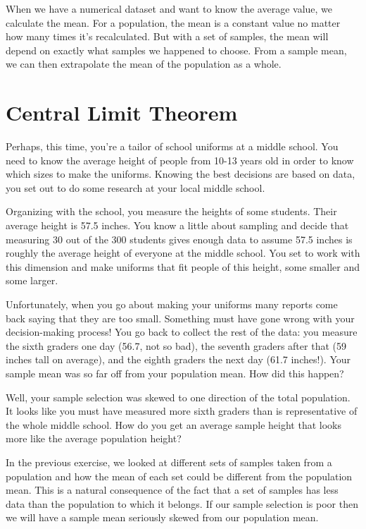 \documentclass{journal}
\begin{document}
When we have a numerical dataset and want to know the average value, we calculate the mean. For a population, the mean is a constant value no matter how many times it's recalculated. But with a set of samples, the mean will depend on exactly what samples we happened to choose. From a sample mean, we can then extrapolate the mean of the population as a whole.\\

\section{Central Limit Theorem}
Perhaps, this time, you're a tailor of school uniforms at a middle school. You need to know the average height of people from 10-13 years old in order to know which sizes to make the uniforms. Knowing the best decisions are based on data, you set out to do some research at your local middle school.

Organizing with the school, you measure the heights of some students. Their average height is 57.5 inches. You know a little about sampling and decide that measuring 30 out of the 300 students gives enough data to assume 57.5 inches is roughly the average height of everyone at the middle school. You set to work with this dimension and make uniforms that fit people of this height, some smaller and some larger.

Unfortunately, when you go about making your uniforms many reports come back saying that they are too small. Something must have gone wrong with your decision-making process! You go back to collect the rest of the data: you measure the sixth graders one day (56.7, not so bad), the seventh graders after that (59 inches tall on average), and the eighth graders the next day (61.7 inches!). Your sample mean was so far off from your population mean. How did this happen?

Well, your sample selection was skewed to one direction of the total population. It looks like you must have measured more sixth graders than is representative of the whole middle school. How do you get an average sample height that looks more like the average population height?

In the previous exercise, we looked at different sets of samples taken from a population and how the mean of each set could be different from the population mean. This is a natural consequence of the fact that a set of samples has less data than the population to which it belongs. If our sample selection is poor then we will have a sample mean seriously skewed from our population mean.
\end{document}
